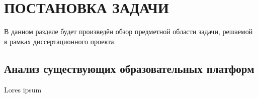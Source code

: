 \section{ПОСТАНОВКА ЗАДАЧИ}

В данном разделе будет произведён обзор предметной области задачи, решаемой в рамках диссертационного проекта.

\subsection{Анализ существующих образовательных платформ}

Lores ipsum
